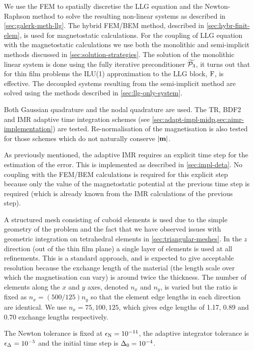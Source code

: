 We use the FEM to spatially discretise the LLG equation and the Newton-Raphson method to solve the resulting non-linear systems as described in \cref{sec:galerk-meth-llg}.
The hybrid FEM/BEM method, described in \cref{sec:hybr-finit-elem}, is used for magnetostatic calculations.
For the coupling of LLG equation with the magnetostatic calculations we use both the monolithic and semi-implicit methods discussed in \cref{sec:solution-strategies}.
The solution of the monolithic linear system is done using the fully iterative preconditioner $\widetilde{\mathcal{P}_3}$, it turns out that for thin film problems the ILU(1) approximation to the LLG block, $\mathrm{F}$, is effective.
The decoupled systems resulting from the semi-implicit method are solved using the methods described in \cref{sec:llg-only-system}.

Both Gaussian quadrature and the nodal quadrature are used.
The TR, BDF2 and IMR adaptive time integration schemes (see \cref{sec:adapt-impl-midp,sec:aimr-implementation}) are tested.
Re-normalisation of the magnetisation is also tested for those schemes which do not naturally conserve $\left|{\boldsymbol{\mathrm{m}}} \right|$.

As previously mentioned, the adaptive IMR requires an explicit time step for the estimation of the error.
This is implemented as described in \cref{sec:impl-deta}.
No coupling with the FEM/BEM calculations is required for this explicit step because only the value of the magnetostatic potential at the previous time step is required (which is already known from the IMR calculations of the previous step).

A structured mesh consisting of cuboid elements is used due to the simple geometry of the problem and the fact that we have observed issues with geometric integration on tetrahedral elements in \cref{sec:triangular-meshes}.
In the $z$ direction (out of the thin film plane) a single layer of elements is used at all refinements.
This is a standard approach, and is expected to give acceptable resolution because the exchange length of the material (the length scale over which the magnetisation can vary) is around twice the thickness.
The number of elements along the $x$ and $y$ axes, denoted $n_x$ and $n_y$, is varied but the ratio is fixed as $n_x = (500/125) n_y$ so that the element edge lengths in each direction are identical.
We use $n_x=75,100,125$, which gives edge lengths of 1.17, 0.89 and 0.70 exchange lengths respectively.

The Newton tolerance is fixed at $\epsilon_{\mathrm{N}} = 10^{-11}$, the adaptive integrator tolerance is $\epsilon_{\Delta_{}} = 10^{-5}$ and the initial time step is $\Delta_{0} = 10^{-4}$.


